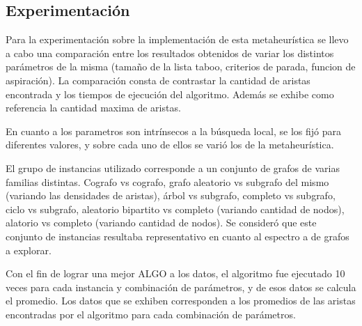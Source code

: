\subsection{Experimentación}

Para la experimentación sobre la implementación de esta metaheurística se
llevo a cabo una comparación entre los resultados obtenidos de variar los
distintos parámetros de la misma (tamaño de la lista taboo, criterios de
parada, funcion de aspiración). La comparación consta de contrastar la
cantidad de aristas encontrada y los tiempos de ejecución del algoritmo.
Además se exhibe como referencia la cantidad maxima de aristas.

En cuanto a los parametros son intrínsecos a la búsqueda local, se los
fijó para diferentes valores, y sobre cada uno de ellos se varió los de
la metaheurística.

El grupo de instancias utilizado corresponde a un conjunto de grafos de varias
familias distintas. Cografo vs cografo, grafo aleatorio vs subgrafo del mismo
(variando las densidades de aristas), árbol vs subgrafo, completo vs subgrafo,
ciclo vs subgrafo, aleatorio bipartito vs completo (variando cantidad de
nodos), alatorio vs completo (variando cantidad de nodos). Se consideró que
este conjunto de instancias resultaba representativo en cuanto al espectro a
de grafos a explorar.

Con el fin de lograr una mejor ALGO a los datos, el algoritmo fue ejecutado
10 veces para cada instancia y combinación de parámetros, y de esos datos se
calcula el promedio. Los datos que se exhiben corresponden a los promedios de
las aristas encontradas por el algoritmo para cada combinación de parámetros.






